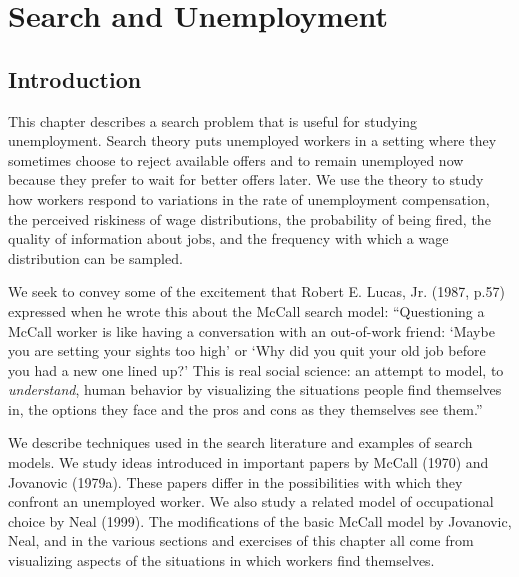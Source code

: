 

%

\def\th{{\theta}}

%
%
\def\lege{\raise.3ex\hbox{$>$\kern-.75em\lower1ex\hbox{$<$}}}
\def\be{{\beta}}
\chapter{Search and Unemployment\label{search1}}

\section{Introduction}

This chapter describes a search problem that
%
%
 is  useful  for studying unemployment.
Search theory puts unemployed workers in a setting where
they  sometimes choose   to reject available offers and to remain
unemployed now because they prefer to wait for better offers later.
We use the theory to study how workers respond
to variations in the rate of unemployment compensation,
the perceived riskiness of wage distributions, the probability of
being fired, the quality of
information about jobs, and the frequency with which a wage
distribution can be sampled.



We seek to  convey some of the excitement that Robert E. Lucas, Jr. (1987, p.57)
expressed when he wrote this about the McCall search model:
``Questioning a McCall worker is like having a conversation with an out-of-work friend:
`Maybe you are setting your sights too high' or `Why did you quit your old job before
you had a new one lined up?' This is real social science: an attempt to model,
to {\it understand\/}, human behavior by visualizing the situations people find themselves in,
the options they face and the pros and cons as they themselves see them.''


We describe techniques used in
the search literature and examples of search models. We
study ideas introduced in important papers by McCall
(1970) and Jovanovic (1979a).  These papers differ in the possibilities
with which they confront an unemployed worker.
We also study a related model of occupational choice by Neal (1999).
The modifications
of the basic McCall model by Jovanovic, Neal, and in the various sections and exercises of this chapter all
come from visualizing  aspects of the situations in which workers find themselves.


